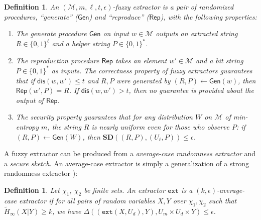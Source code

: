 \documentclass[11pt]{article}
\newcommand{\class}[1]{{\ensuremath{\mathsf{#1}}}}
\newcommand{\gen}{\ensuremath{\class{Gen}}\xspace}
\newcommand{\rep}{\ensuremath{\class{Rep}}\xspace}
\newcommand{\dis}{\ensuremath{\mathsf{dis}}}
\newcommand{\ext}{\ensuremath{\mathtt{ext}}}
\newtheorem{definition}[theorem]{Definition}
\begin{document}
\begin{definition}%
An $(\mathcal{M}, m, \ell, t, \epsilon)$-\emph{fuzzy extractor} is a pair of randomized procedures, ``generate'' (\gen) and ``reproduce'' (\rep), with the following properties:
\begin{enumerate}
\item The generate procedure \gen on input $w\in \mathcal{M}$ outputs an extracted string $R\in\{0,1\}^\ell$ and a helper string $P\in\{0,1\}^*$.
\item The reproduction procedure \rep takes an element $w'\in \mathcal{M}$ and a bit string $P\in\{0,1\}^*$ as inputs.  The \emph{correctness} property of fuzzy extractors guarantees that if $\dis(w,w')\leq t$ and $R,P$ were generated by $(R,P)\leftarrow\gen(w)$, then $\rep(w',P)=R$.  If $\dis(w,w')>t$, then no guarantee is provided about the output of \rep.
\item The \emph{security} property guarantees that for any distribution $W$ on $\mathcal{M}$ of min-entropy $m$, the string $R$ is nearly uniform even for those who observe $P$:  if $(R,P)\leftarrow\gen (W)$, then $\mathbf{SD}((R,P),(U_\ell,P))\leq \epsilon$.
\end{enumerate}
\end{definition}
A fuzzy extractor can be produced from a \emph{average-case randomness extractor} %
and a \emph{secure sketch}.  
An average-case extractor is simply a generalization of a strong randomness extractor \cite[Definition 2]{nisan1993randomness}):

\begin{definition}
Let $\chi_1$, $\chi_2$ be finite sets.
An extractor $\ext$ is a \emph{$(k, \epsilon)$-average-case extractor} if for all pairs
of random variables $X, Y$ over $\chi_1, \chi_2$ such that
$\tilde{H}_\infty(X|Y) \ge k$, we have $\Delta((\ext(X, U_d), Y), U_m\times
U_d \times Y) \le \epsilon$.
\end{definition}
\end{document}
